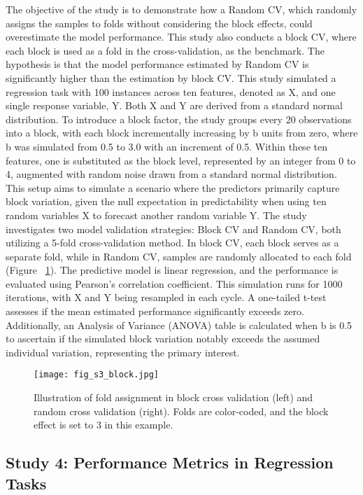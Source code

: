 The objective of the study is to demonstrate how a Random CV, which randomly assigns the samples to folds without considering the block effects, could overestimate the model performance. This study also conducts a block CV, where each block is used as a fold in the cross-validation, as the benchmark. The hypothesis is that the model performance estimated by Random CV is significantly higher than the estimation by block CV. This study simulated a regression task with 100 instances across ten features, denoted as X, and one single response variable, Y. Both X and Y are derived from a standard normal distribution. To introduce a block factor, the study groups every 20 observations into a block, with each block incrementally increasing by b units from zero, where b was simulated from 0.5 to 3.0 with an increment of 0.5. Within these ten features, one is substituted as the block level, represented by an integer from 0 to 4, augmented with random noise drawn from a standard normal distribution. This setup aims to simulate a scenario where the predictors primarily capture block variation, given the null expectation in predictability when using ten random variables X to forecast another random variable Y.
The study investigates two model validation strategies: Block CV and Random CV, both utilizing a 5-fold cross-validation method. In block CV, each block serves as a separate fold, while in Random CV, samples are randomly allocated to each fold (Figure ~\ref{fig:s3_block}). The predictive model is linear regression, and the performance is evaluated using Pearson's correlation coefficient. This simulation runs for 1000 iterations, with X and Y being resampled in each cycle. A one-tailed t-test assesses if the mean estimated performance significantly exceeds zero. Additionally, an Analysis of Variance (ANOVA) table is calculated when b is 0.5 to ascertain if the simulated block variation notably exceeds the assumed individual variation, representing the primary interest.

\begin{figure}[h]
    \centering
    \texttt{[image: fig\_s3\_block.jpg]}
    \caption{Illustration of fold assignment in block cross validation (left) and random cross validation (right). Folds are color-coded, and the block effect is set to 3 in this example.}
    \label{fig:s3_block}
\end{figure}

\subsection{Study 4: Performance Metrics in Regression Tasks}

